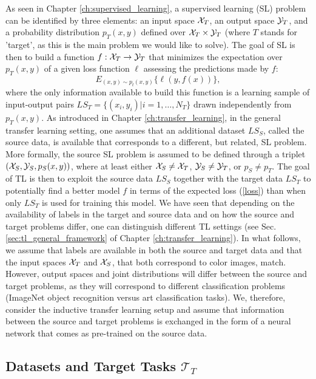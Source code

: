 As seen in Chapter \ref{ch:supervised_learning}, a supervised learning (SL) problem can be identified by three elements: an input space ${\cal X}_T$, an output space ${\cal Y}_T$, and a probability distribution $p_T(x,y)$ defined over ${\cal X}_T\times {\cal Y}_T$ (where $T$ stands for 'target', as this is the main problem we would like to solve). The goal of SL is then to build a function $f:{\cal X}_T\rightarrow{\cal Y}_T$ that minimizes the expectation over $p_T(x,y)$ of a given loss function $\ell$ assessing the predictions made by $f$:
\begin{equation}\label{loss}
  E_{(x,y)\sim p_t(x,y)} \{\ell(y,f(x))\},
\end{equation}
where the only information available to build this function is a learning sample of input-output pairs $LS_T=\{(x_i,y_i)|i=1,\ldots,N_T\}$ drawn independently from $p_T(x,y)$. As introduced in Chapter \ref{ch:transfer_learning}, in the general transfer learning setting, one assumes that an additional dataset $LS_S$, called the source data, is available that corresponds to a different, but related, SL problem. More formally, the source SL problem is assumed to be defined through a triplet $({\cal X}_S,{\cal Y}_S,p_S(x,y))$, where at least either ${\cal X}_S\neq {\cal X}_T$, ${\cal Y}_S\neq {\cal Y}_T$, or $p_S\neq p_T$. The goal of TL is then to exploit the source data $LS_S$ together with the target data $LS_T$ to potentially find a better model $f$ in terms of the expected loss (\ref{loss}) than when only $LS_T$ is used for training this model.
We have seen that depending on the availability of labels in the target and source data and on how the source and target problems differ, one can distinguish different TL settings (see Sec. \ref{sec:tl_general_framework} of Chapter \ref{ch:transfer_learning}). In what follows, we assume that labels are available in both the source and target data and that the input spaces ${\cal X}_T$ and ${\cal X}_S$, that both correspond to color images, match. However, output spaces and joint distributions will differ between the source and target problems, as they will correspond to different classification problems (ImageNet object recognition versus art classification tasks). We, therefore, consider the inductive transfer learning setup and assume that information between the source and target problems is exchanged in the form of a neural network that comes as pre-trained on the source data. 

\subsection{Datasets and Target Tasks $\mathcal{T}_T$}
\label{subsec:datasets}


